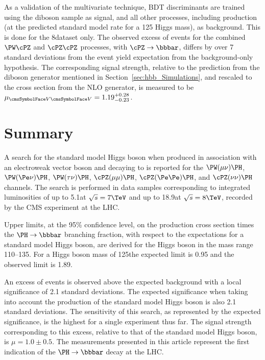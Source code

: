 \documentclass[11pt,twoside,a4paper,cmspaper,final,collab]{cms-tdr}
\begin{document}
As a validation of the multivariate technique, BDT discriminants are trained
using the diboson sample as signal, and all other processes, including
\VH production (at the predicted standard model rate for a 125\GeV
Higgs mass), as background. This is done for the 8\TeV dataset only.
The observed excess of events for the combined $\PW\cPZ$ and $\cPZ\cPZ$ processes, with
$\cPZ\to\bbbar$, differs by over 7 standard deviations from the event yield expectation
from the background-only hypothesis. The corresponding signal
strength, relative to
the prediction from the diboson {\MADGRAPH} generator mentioned in
Section~\ref{sec:hbb_Simulations},
and rescaled to the cross section from the NLO {\MCFM} generator,
is measured to be  $\mu_{\Vvar\Vvar} = {1.19}_{-0.23}^{+0.28}$.


\section{Summary}\label{sec:hbb_Conclusions}


 A search for the standard model Higgs boson when produced in association with an electroweak
   vector boson and decaying to
\bbbar is reported for the $\PW(\mu\nu)\PH$,
   $\PW(\Pe\nu)\PH$,
$\PW(\tau\nu)\PH$, $\cPZ(\mu\mu)\PH$, $\cPZ(\Pe\Pe)\PH$, and
   $\cPZ(\nu\nu)\PH$ channels. The search is performed in data samples corresponding to integrated
luminosities of up to 5.1\fbinv at $\sqrt{s}=7\TeV$ and up to
18.9\fbinv at $\sqrt{s}=8\TeV$, recorded by the CMS experiment
at the LHC.


Upper limits, at the 95\% confidence level, on the
   \VH production cross section times the $\PH \to \bbbar$
   branching fraction, with respect to the expectations for a standard
   model Higgs boson, are derived for the Higgs boson in the mass range
   110--135\GeV. For a Higgs
   boson mass of 125\GeV the expected limit is 0.95 and the observed
   limit is 1.89.

An excess of events is observed above the expected
   background with a local significance of 2.1 standard deviations. The
   expected significance when taking into account the production of the
   standard model Higgs boson is also 2.1 standard deviations. The sensitivity of this
   search, as represented by the expected significance, is the highest
   for a single experiment thus far.  The signal strength corresponding to this excess, relative to that of
   the standard model Higgs boson, is  $\mu = 1.0\pm 0.5$. The
   measurements presented in this article represent the first indication
   of the $\PH \to \bbbar$ decay at the LHC.
\end{document}
